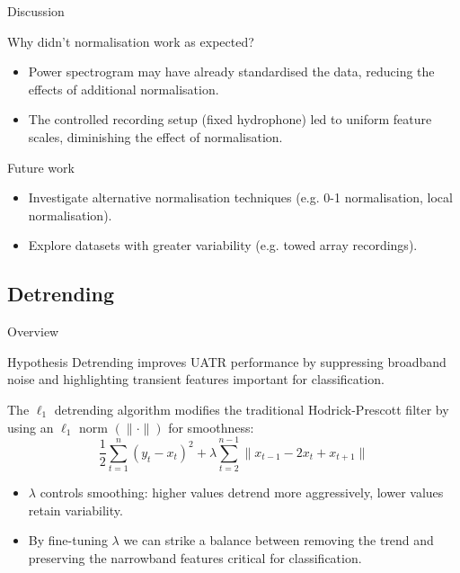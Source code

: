 \documentclass[]{beamer}
\begin{document}
\begin{frame}{Discussion}
    \begin{alertblock}{Why didn't normalisation work as expected?}
        \begin{itemize}
            \item Power spectrogram may have already standardised the data, reducing the effects of additional normalisation.
            \item The controlled recording setup (fixed hydrophone) led to uniform feature scales, diminishing the effect of normalisation.
        \end{itemize}
    \end{alertblock}

    \begin{block}{Future work}
        \begin{itemize}
            \item Investigate alternative normalisation techniques (e.g. 0-1 normalisation, local normalisation).
            \item Explore datasets with greater variability (e.g. towed array recordings).
        \end{itemize}
    \end{block}
\end{frame}

\subsection{Detrending}

\begin{frame}{Overview}
    \begin{block}{Hypothesis}
        Detrending improves UATR performance by suppressing broadband noise and highlighting transient features important for classification. %
    \end{block}
    
    \small
    The $\ell_1$ detrending algorithm modifies the traditional Hodrick-Prescott filter by using an $\ell_1$ norm $(\| \cdot \|)$ for smoothness:
    \begin{equation*}
        \frac{1}{2} \sum_{t=1}^n (y_t - x_t)^2 + \lambda \sum_{t=2}^{n-1} \| x_{t-1} - 2x_t + x_{t+1} \|
    \end{equation*}
    \vspace{-7pt}
    \begin{itemize}
        \item $\lambda$ controls smoothing: higher values detrend more aggressively, lower values retain variability.
        \item By fine-tuning $\lambda$ we can strike a balance between removing the trend and preserving the narrowband features critical for classification.
    \end{itemize}
\end{frame}
\end{document}

